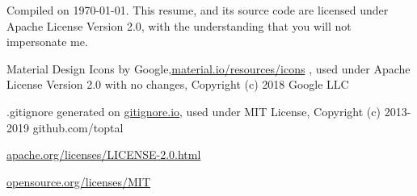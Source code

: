 \hspace{1pt}

\tiny{

Compiled on \today. This resume, and its source code are licensed under Apache License Version 2.0, with the understanding that you will not impersonate me.

Material Design Icons by Google,{\secondaryColor\href{https://material.io/resources/icons}{material.io/resources/icons} }, used under Apache License Version 2.0 with no changes, Copyright (c) 2018 Google LLC

.gitignore generated on {\secondaryColor\href{https://gitignore.io}{gitignore.io}}, used under MIT License, Copyright (c) 2013-2019 github.com/toptal

{\secondaryColor\href{https://www.apache.org/licenses/LICENSE-2.0.html}{apache.org/licenses/LICENSE-2.0.html}}

{\secondaryColor\href{https://opensource.org/licenses/MIT}{opensource.org/licenses/MIT}}

}